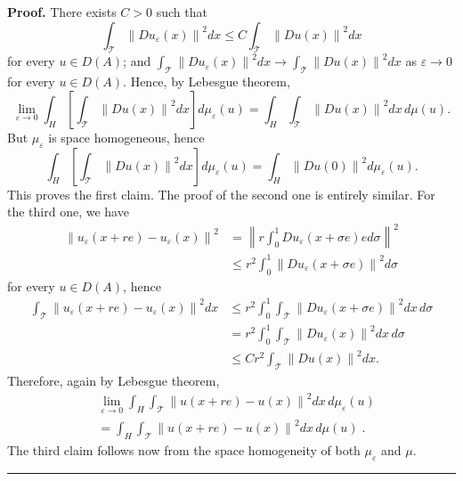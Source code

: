 \documentclass[11pt]{preprint}
\newenvironment{proof}[1][Proof]{\textbf{#1.} }{\ \rule{0.5em}{0.5em}}
\begin{document}
\begin{proof}
There exists $C>0$ such that
\[
\int_{\mathcal{T}}\left\|  Du_{\varepsilon}\left(  x\right)  \right\|
^{2}dx\leq C\int_{\mathcal{T}}\left\|  Du\left(  x\right)  \right\|  ^{2}dx
\]
for every $u\in D(A)$; and $\int_{\mathcal{T}}\left\|  Du_{\varepsilon}\left(
x\right)  \right\|  ^{2}dx\rightarrow\int_{\mathcal{T}}\left\|  Du\left(
x\right)  \right\|  ^{2}dx$ as $\varepsilon\rightarrow0$ for every $u\in
D(A)$. Hence, by Lebesgue theorem,
\[
\lim_{\varepsilon\rightarrow0}\int_{H}\left[  \int_{\mathcal{T}}\left\|
Du\left(  x\right)  \right\|  ^{2}dx\right]  d\mu_{\varepsilon}\left(
u\right)  =\int_{H}\int_{\mathcal{T}}\left\|  Du\left(  x\right)  \right\|
^{2}dx\,d\mu\left(  u\right)  .
\]
But $\mu_{\varepsilon}$ is space homogeneous, hence
\[
\int_{H}\left[  \int_{\mathcal{T}}\left\|  Du\left(  x\right)  \right\|
^{2}dx\right]  d\mu_{\varepsilon}\left(  u\right)  =\int_{H}\left\|  Du\left(
0\right)  \right\|  ^{2}d\mu_{\varepsilon}\left(  u\right)  .
\]
This proves the first claim. The proof of the second one is entirely similar.
For the third one, we have
\begin{align*}
\left\|  u_{\varepsilon}\left(  x+re\right)  -u_{\varepsilon}\left(  x\right)
\right\|  ^{2} &  =\left\|  r\int_{0}^{1}Du_{\varepsilon}\left(  x+\sigma
e\right)  ed\sigma\right\|  ^{2}\\
&  \leq r^{2}\int_{0}^{1}\left\|  Du_{\varepsilon}\left(  x+\sigma e\right)
\right\|  ^{2}d\sigma
\end{align*}
for every $u\in D(A)$, hence
\begin{align*}
\int_{\mathcal{T}}\left\|  u_{\varepsilon}\left(  x+re\right)  -u_{\varepsilon
}\left(  x\right)  \right\|  ^{2}dx &  \leq r^{2}\int_{0}^{1}\int
_{\mathcal{T}}\left\|  Du_{\varepsilon}\left(  x+\sigma e\right)  \right\|
^{2}dx\,d\sigma\\
&  =r^{2}\int_{0}^{1}\int_{\mathcal{T}}\left\|  Du_{\varepsilon}\left(
x\right)  \right\|  ^{2}dx\,d\sigma\\
&  \leq Cr^{2}\int_{\mathcal{T}}\left\|  Du\left(  x\right)  \right\|  ^{2}dx.
\end{align*}
Therefore, again by Lebesgue theorem,
\begin{align*}
&  \lim_{\varepsilon\rightarrow0}\int_{H}\int_{\mathcal{T}}\left\|  u\left(
x+re\right)  -u\left(  x\right)  \right\|  ^{2}dx\,d\mu_{\varepsilon}\left(
u\right) \\
&  =\int_{H}\int_{\mathcal{T}}\left\|  u\left(  x+re\right)  -u\left(
x\right)  \right\|  ^{2}dx\,d\mu\left(  u\right)\; .
\end{align*}
The third claim follows now from the space homogeneity of both $\mu
_{\varepsilon}$ and $\mu$.
\end{proof}
\end{document}

